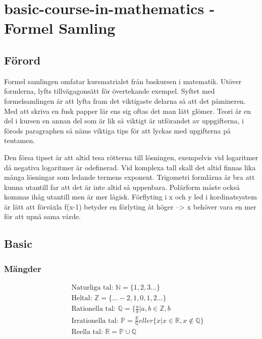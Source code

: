 \chapter{basic-course-in-mathematics - Formel Samling}

\section{Förord}
Formel samlingen omfatar kursmatrialet från baskursen i matematik. Utöver formlerna, lyfts tillvägagonsätt för övertekande exempel. Syftet med formelsamlingen är att lyfta fram det viktigaste delarna så att det påmineren. Med att skriva en fusk papper lär ens sig oftas det man lätt glömer. Teori är en del i kursen en annan del som är lik så viktigt är utförandet av uppgifterna, i förods paragraphen så näms viktiga tips för att lyckas med upgifterna på tentamen.

Den försa tipset är att altid tesa rötterna till lösningen, exempelvis vid logaritmer då negativa logaritmer är odefinerad. Vid komplexa tall skall det altid finnas lika många lösningar som ledande termens exponent. Trigometri formlärna är bra att kunna utantill far att det är inte altid så uppenbara. Polärform måste också kommas ihåg utantill men är mer lågisk. Förflyting i x och y led i kordinatsystem är lätt att förväxla f(x-1) betyder en förlyting åt höger --> x behöver vara en mer för att upnå sama värde.   

\newpage

\section{Basic}
\subsection{Mängder}
\begin{align*}
  &\quad \text{Naturliga tal: } \mathbb{N} = \{ 1, 2 , 3 ...  \} \\
  &\quad \text{Heltal: }\mathbb{Z} = \{... -2, 1, 0, 1, 2 ...  \} \\
  &\quad \text{Rationella tal: }\mathbb{Q} = \{ \frac{a}{b} | a,b \in \mathbb{Z}, b \\
  &\quad \text{Irrationella tal: }\mathbb{P} = \frac{\mathbb{R}}{\mathbb{Q}}eller \{ x | x \in \mathbb{R}, x \notin \mathbb{Q} \} \\
  &\quad \text{Reella tal: }\mathbb{R} =  \mathbb{P} \cup \mathbb{Q} \\
\end{align*}


